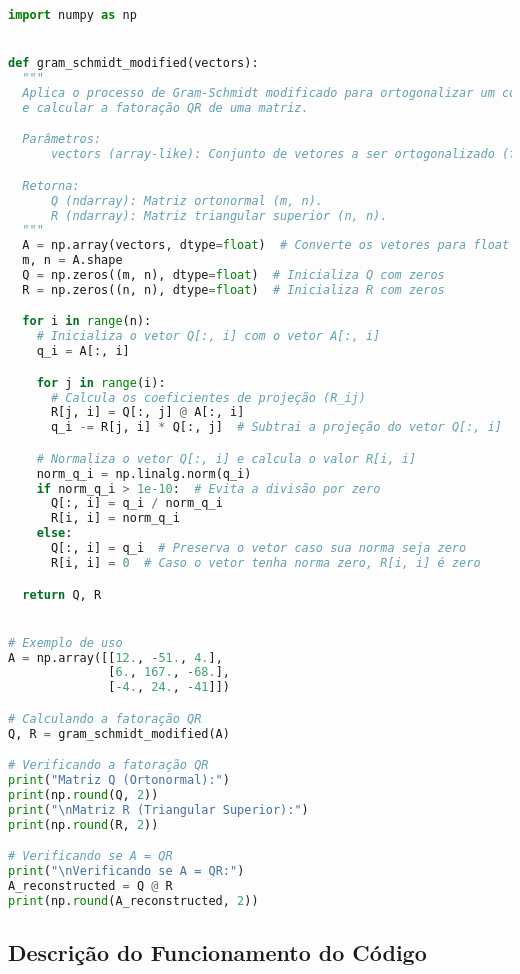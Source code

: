 \vspace{8pt}
\begin{lstlisting}[language=Python, caption={Implementação do algoritmo de Gram-Schmidt modificado para calcular a fatoração QR de uma matriz.}]
import numpy as np


def gram_schmidt_modified(vectors):
  """
  Aplica o processo de Gram-Schmidt modificado para ortogonalizar um conjunto de vetores
  e calcular a fatoração QR de uma matriz.

  Parâmetros:
      vectors (array-like): Conjunto de vetores a ser ortogonalizado (forma (m, n)).

  Retorna:
      Q (ndarray): Matriz ortonormal (m, n).
      R (ndarray): Matriz triangular superior (n, n).
  """
  A = np.array(vectors, dtype=float)  # Converte os vetores para float
  m, n = A.shape
  Q = np.zeros((m, n), dtype=float)  # Inicializa Q com zeros
  R = np.zeros((n, n), dtype=float)  # Inicializa R com zeros

  for i in range(n):
    # Inicializa o vetor Q[:, i] com o vetor A[:, i]
    q_i = A[:, i]

    for j in range(i):
      # Calcula os coeficientes de projeção (R_ij)
      R[j, i] = Q[:, j] @ A[:, i]
      q_i -= R[j, i] * Q[:, j]  # Subtrai a projeção do vetor Q[:, i]

    # Normaliza o vetor Q[:, i] e calcula o valor R[i, i]
    norm_q_i = np.linalg.norm(q_i)
    if norm_q_i > 1e-10:  # Evita a divisão por zero
      Q[:, i] = q_i / norm_q_i
      R[i, i] = norm_q_i
    else:
      Q[:, i] = q_i  # Preserva o vetor caso sua norma seja zero
      R[i, i] = 0  # Caso o vetor tenha norma zero, R[i, i] é zero

  return Q, R


# Exemplo de uso
A = np.array([[12., -51., 4.],
              [6., 167., -68.],
              [-4., 24., -41]])

# Calculando a fatoração QR
Q, R = gram_schmidt_modified(A)

# Verificando a fatoração QR
print("Matriz Q (Ortonormal):")
print(np.round(Q, 2))
print("\nMatriz R (Triangular Superior):")
print(np.round(R, 2))

# Verificando se A = QR
print("\nVerificando se A = QR:")
A_reconstructed = Q @ R
print(np.round(A_reconstructed, 2))
\end{lstlisting}

\subsection{Descrição do Funcionamento do Código}

